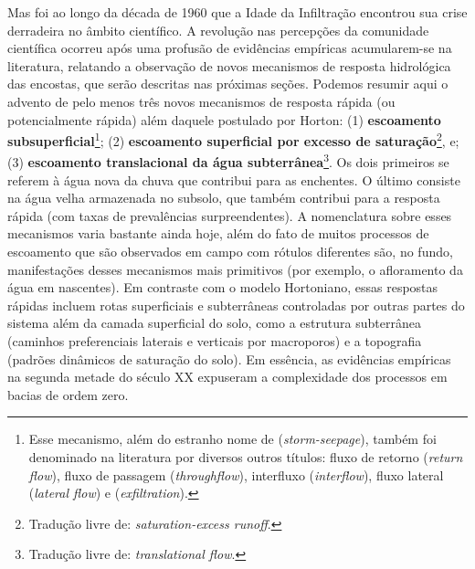 \documentclass[./main.tex]{subfiles}
\begin{document}
\par Mas foi ao longo da década de 1960 que a Idade da Infiltração encontrou sua crise derradeira no âmbito científico. A revolução nas percepções da comunidade científica ocorreu após uma profusão de evidências empíricas acumularem-se na literatura, relatando a observação de novos mecanismos de resposta hidrológica das encostas, que serão descritas nas próximas seções. Podemos resumir aqui o advento de pelo menos três novos mecanismos de resposta rápida (ou potencialmente rápida) além daquele postulado por Horton: (1) \textbf{escoamento subsuperficial}\footnote{Esse mecanismo, além do estranho nome de  (\textit{storm-seepage}), também foi denominado na literatura por diversos outros títulos: fluxo de retorno (\textit{return flow}), fluxo de passagem (\textit{throughflow}), interfluxo (\textit{interflow}), fluxo lateral (\textit{lateral flow}) e  (\textit{exfiltration}).}; (2) \textbf{escoamento superficial por excesso de saturação}\footnote{Tradução livre de: \textit{saturation-excess runoff}.}, e; (3) \textbf{escoamento translacional da água subterrânea}\footnote{Tradução livre de: \textit{translational flow}.}. Os dois primeiros se referem à água nova da chuva que contribui para as enchentes. O último consiste na água velha armazenada no subsolo, que também contribui para a resposta rápida (com taxas de prevalências surpreendentes). A nomenclatura sobre esses mecanismos varia bastante ainda hoje, além do fato de muitos processos de escoamento que são observados em campo com rótulos diferentes são, no fundo, manifestações desses mecanismos mais primitivos (por exemplo, o afloramento da água em nascentes). Em contraste com o modelo Hortoniano, essas respostas rápidas incluem rotas superficiais e subterrâneas controladas por outras partes do sistema além da camada superficial do solo, como a estrutura subterrânea (caminhos preferenciais laterais e verticais por macroporos) e a topografia (padrões dinâmicos de saturação do solo). Em essência, as evidências empíricas na segunda metade do século XX expuseram a complexidade dos processos em bacias de ordem zero.
\end{document}
